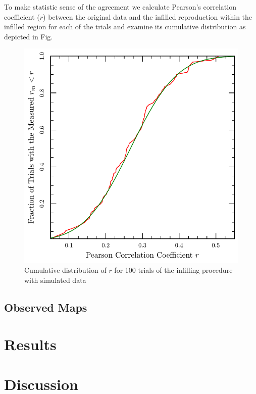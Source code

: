 \documentclass[useAMS,usenatbib]{mn2e}
\begin{document}
To make statistic sense of the agreement we calculate Pearson's
correlation coefficient ($r$) between the original data and the
infilled reproduction within the infilled region for each of the
trials and examine its cumulative distribution as depicted in
Fig.~

\begin{figure}
  \includegraphics[width=\columnwidth]{cleantest}
  \caption{Cumulative distribution of $r$ for 100 trials of the
    infilling procedure with simulated data}
\end{figure}


\subsection{Observed Maps}

\section{Results}

\section{Discussion}





\label{lastpage}
\end{document}
